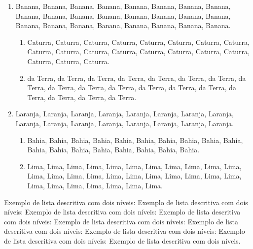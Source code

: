 \begin{enumerate}

\item Banana, Banana, Banana, Banana, Banana, Banana, Banana, Banana, Banana, Banana, Banana, Banana, Banana, Banana, Banana, Banana, Banana, Banana, Banana, Banana, Banana, Banana, Banana, Banana.

\begin{enumerate}

\item Caturra, Caturra, Caturra, Caturra, Caturra, Caturra, Caturra, Caturra, Caturra, Caturra, Caturra, Caturra, Caturra, Caturra, Caturra, Caturra, Caturra, Caturra, Caturra.

\item da Terra, da Terra, da Terra, da Terra, da Terra, da Terra, da Terra, da Terra, da Terra, da Terra, da Terra, da Terra, da Terra, da Terra, da Terra, da Terra, da Terra, da Terra.

\end{enumerate}

\item Laranja, Laranja, Laranja, Laranja, Laranja, Laranja, Laranja, Laranja, Laranja, Laranja, Laranja, Laranja, Laranja, Laranja, Laranja, Laranja.

\begin{enumerate}

\item Bahia, Bahia, Bahia, Bahia, Bahia, Bahia, Bahia, Bahia, Bahia, Bahia, Bahia, Bahia, Bahia, Bahia, Bahia, Bahia, Bahia, Bahia.

\item Lima, Lima, Lima, Lima, Lima, Lima, Lima, Lima, Lima, Lima, Lima, Lima, Lima, Lima, Lima, Lima, Lima, Lima, Lima, Lima, Lima, Lima, Lima, Lima, Lima, Lima, Lima, Lima, Lima.

\end{enumerate}

\end{enumerate}

Exemplo de lista descritiva com dois níveis: Exemplo de lista descritiva com dois níveis: Exemplo de lista descritiva com dois níveis: Exemplo de lista descritiva com dois níveis: Exemplo de lista descritiva com dois níveis: Exemplo de lista descritiva com dois níveis: Exemplo de lista descritiva com dois níveis: Exemplo de lista descritiva com dois níveis: Exemplo de lista descritiva com dois níveis.

